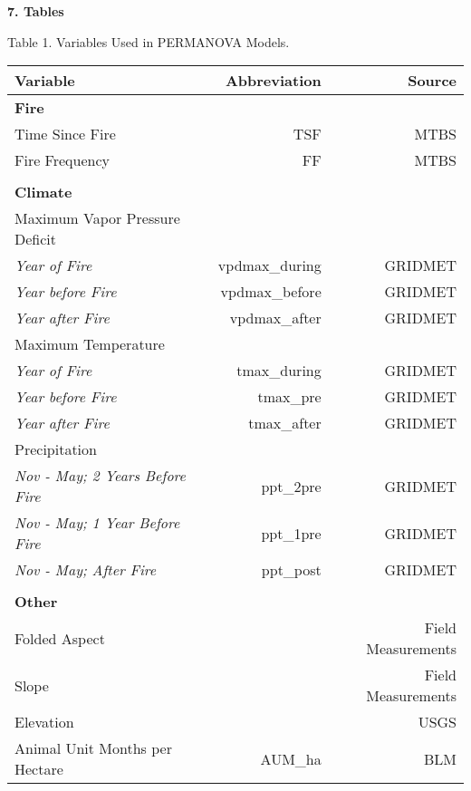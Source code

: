\documentclass[8pt,]{article}
\title{}
\author{}
\date{}
\begin{document}
\textbf{7. Tables}

Table 1. Variables Used in PERMANOVA Models.

\begin{longtable}[]{@{}lrr@{}}
\toprule
Variable & Abbreviation & Source\tabularnewline
\midrule
\endhead
\textbf{Fire} & &\tabularnewline
Time Since Fire & TSF & MTBS\tabularnewline
Fire Frequency & FF & MTBS\tabularnewline
& &\tabularnewline
\textbf{Climate} & &\tabularnewline
Maximum Vapor Pressure Deficit & &\tabularnewline
\emph{Year of Fire} & vpdmax\_during & GRIDMET\tabularnewline
\emph{Year before Fire} & vpdmax\_before & GRIDMET\tabularnewline
\emph{Year after Fire} & vpdmax\_after & GRIDMET\tabularnewline
Maximum Temperature & &\tabularnewline
\emph{Year of Fire} & tmax\_during & GRIDMET\tabularnewline
\emph{Year before Fire} & tmax\_pre & GRIDMET\tabularnewline
\emph{Year after Fire} & tmax\_after & GRIDMET\tabularnewline
Precipitation & &\tabularnewline
\emph{Nov - May; 2 Years Before Fire} & ppt\_2pre &
GRIDMET\tabularnewline
\emph{Nov - May; 1 Year Before Fire} & ppt\_1pre &
GRIDMET\tabularnewline
\emph{Nov - May; After Fire} & ppt\_post & GRIDMET\tabularnewline
& &\tabularnewline
\textbf{Other} & &\tabularnewline
Folded Aspect & & Field Measurements\tabularnewline
Slope & & Field Measurements\tabularnewline
Elevation & & USGS\tabularnewline
Animal Unit Months per Hectare & AUM\_ha & BLM\tabularnewline
\bottomrule
\end{longtable}

\clearpage
\newpage
\end{document}
